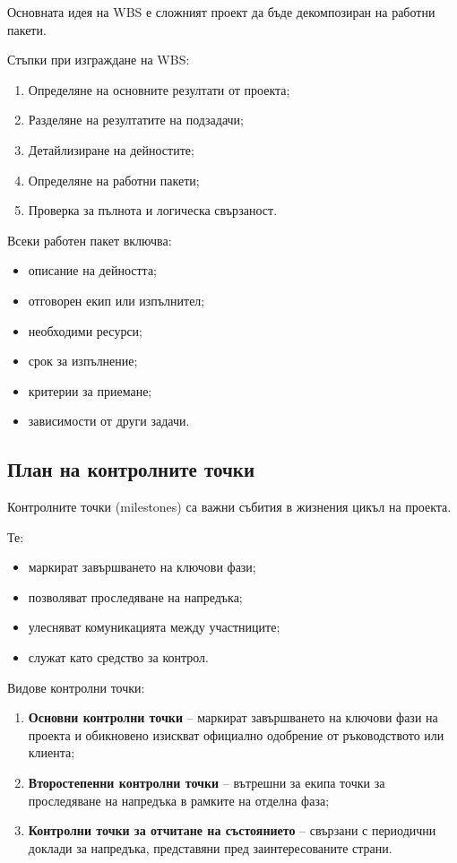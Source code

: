 \documentclass{scrartcl}
\begin{document}
\begin{FlushLeft}
Основната идея на WBS е сложният проект да бъде декомпозиран на работни пакети.

Стъпки при изграждане на WBS:

\begin{enumerate}
    \item Определяне на основните резултати от проекта;
    \item Разделяне на резултатите на подзадачи;
    \item Детайлизиране на дейностите;
    \item Определяне на работни пакети;
    \item Проверка за пълнота и логическа свързаност.
\end{enumerate}

Всеки работен пакет включва:

\begin{itemize}
    \item описание на дейността;
    \item отговорен екип или изпълнител;
    \item необходими ресурси;
    \item срок за изпълнение;
    \item критерии за приемане;
    \item зависимости от други задачи.
\end{itemize}

\subsection{План на контролните точки}

Контролните точки (milestones) са важни събития в жизнения цикъл на проекта.

Те:

\begin{itemize}
    \item маркират завършването на ключови фази;
    \item позволяват проследяване на напредъка;
    \item улесняват комуникацията между участниците;
    \item служат като средство за контрол.
\end{itemize}

Видове контролни точки:

\begin{enumerate}
    \item \textbf{Основни контролни точки} – маркират завършването на ключови фази на проекта и обикновено изискват официално одобрение от ръководството или клиента;
    \item \textbf{Второстепенни контролни точки} – вътрешни за екипа точки за проследяване на напредъка в рамките на отделна фаза;
    \item \textbf{Контролни точки за отчитане на състоянието} – свързани с периодични доклади за напредъка, представяни пред заинтересованите страни.
\end{enumerate}


\end{FlushLeft}
\end{document}
